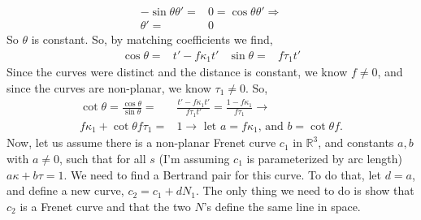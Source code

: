 \documentclass[12pt]{amsart}
\begin{document}
\begin{enumerate}
\begin{align*}
	\\-\sin\theta\theta'=&0=\cos\theta\theta'\Rightarrow
	\\\theta'=&0
\end{align*}
So $\theta$ is constant. So, by matching coefficients we find,
\begin{align*}
	\cos\theta=&t'-f\kappa_1t' & \sin\theta=&f\tau_1t'
\end{align*}
Since the curves were distinct and the distance is constant, we know $f\neq0$, and since the curves are non-planar, we know $\tau_1\neq0$. So,
\begin{align*}
	\cot\theta=\frac{\cos\theta}{\sin\theta}=&\frac{t'-f\kappa_1t'}{f\tau_1t'}=\frac{1-f\kappa_1}{f\tau_1}\rightarrow
	\\f\kappa_1+\cot\theta f\tau_1=&1\rightarrow \text{ let }a=f\kappa_1 \text{, and }b=\cot\theta f.
\end{align*}
Now, let us assume there is a non-planar Frenet curve $c_1$ in $\mathbb{R}^3$, and constants $a,b$ with $a\neq0$, such that for all $s$ (I'm assuming $c_1$ is parameterized by arc length) $a\kappa+b\tau=1$. We need to find a Bertrand pair for this curve. To do that, let $d=a$, and define a new curve, $c_2=c_1+dN_1$. The only thing we need to do is show that $c_2$ is a Frenet curve and that the two $N$'s define the same line in space.


\end{enumerate}
\end{document}
